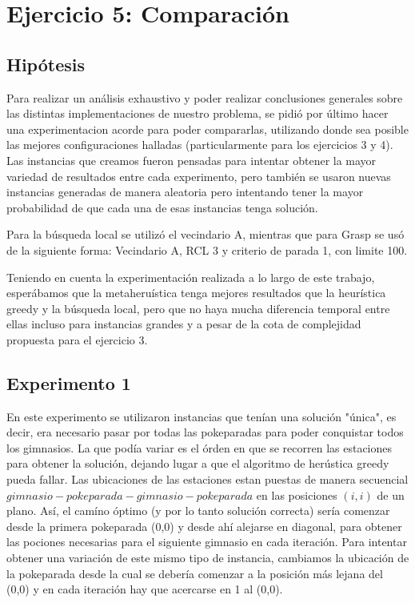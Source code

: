 \section{Ejercicio 5: Comparación}


    \subsection{Hipótesis}
        Para realizar un análisis exhaustivo y poder realizar conclusiones generales sobre las distintas implementaciones de nuestro problema, se pidió por último hacer una experimentacion acorde para poder compararlas, utilizando donde sea posible las mejores configuraciones halladas (particularmente para los ejercicios 3 y 4).
        Las instancias que creamos fueron pensadas para intentar obtener la mayor variedad de resultados entre cada experimento, pero también se usaron nuevas instancias generadas de manera aleatoria pero intentando tener la mayor probabilidad de que cada una de esas instancias tenga solución.

        Para la búsqueda local se utilizó el vecindario A, mientras que para Grasp se usó de la siguiente forma: Vecindario A, RCL 3 y criterio de parada 1, con limite 100.

        Teniendo en cuenta la experimentación realizada a lo largo de este trabajo, esperábamos que la metaheruística tenga mejores resultados que la heurística greedy y la búsqueda local, pero que no haya mucha diferencia temporal entre ellas incluso para instancias grandes y a pesar de la cota de complejidad propuesta para el ejercicio 3.

    \subsection{Experimento 1}
        En este experimento se utilizaron instancias que tenían una solución "única", es decir, era necesario pasar por todas las pokeparadas para poder conquistar todos los gimnasios. La que podía variar es el órden en que se recorren las estaciones para obtener la solución, dejando lugar a que el algoritmo de herústica greedy pueda fallar. Las ubicaciones de las estaciones estan puestas de manera secuencial $gimnasio-pokeparada-gimnasio-pokeparada$ en las posiciones $(i,i)$ de un plano. Así, el camíno óptimo (y por lo tanto solución correcta) sería comenzar desde la primera pokeparada (0,0) y desde ahí alejarse en diagonal, para obtener las pociones necesarias para el siguiente gimnasio en cada iteración.
        Para intentar obtener una variación de este mismo tipo de instancia, cambiamos la ubicación de la pokeparada desde la cual se debería comenzar a la posición más lejana del (0,0) y en cada iteración hay que acercarse en 1 al (0,0). 

